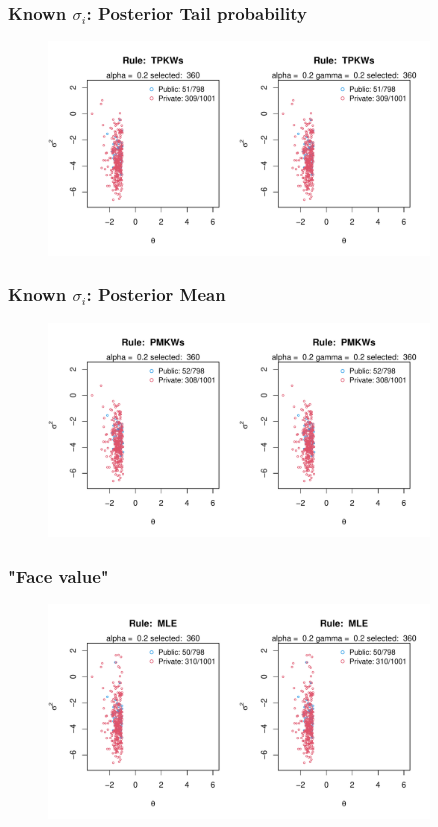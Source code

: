 \documentclass[10pt,mathserif,aspectratio=169]{beamer}
\begin{document}
\begin{frame}
  \frametitle{Known $\sigma_i$: Posterior Tail probability}
  \begin{figure}
    \centering
    \includegraphics[width=0.9\textwidth]{../../Figures/2013-2022/GMM_m/GLmix/Left_0.2_0.2_TPKWs.pdf}
  \end{figure}
\end{frame}

\begin{frame}
  \frametitle{Known $\sigma_i$: Posterior Mean}
  \begin{figure}
    \centering
    \includegraphics[width=0.9\textwidth]{../../Figures/2013-2022/GMM_m/GLmix/Left_0.2_0.2_PMKWs.pdf}
  \end{figure}
\end{frame}

\begin{frame}
  \frametitle{"Face value"}
  \begin{figure}
    \centering
    \includegraphics[width=0.9\textwidth]{../../Figures/2013-2022/GMM_m/GLmix/Left_0.2_0.2_MLE.pdf}
  \end{figure}
\end{frame}
\end{document}

